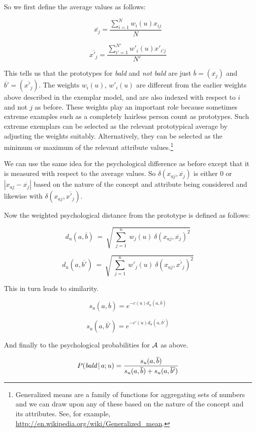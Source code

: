 So we first define the average values as follows:

\[ \overline{x_j} = \frac{\sum_{i = 1}^N w_i(u) x_{ij}}{N} \]

\[ \overline{x'_j} = \frac{\sum_{i' = 1}^{N'} w'_i(u) x'_{i'j}}{N'} \]

This tells us that the prototypes for \emph{bald} and \emph{not bald} are just $\overline{b} = (\overline{x_j})$ and $\overline{b'} = (\overline{x'_j})$. The weights $w_i(u)$, $w'_i(u)$ are different from the earlier weights above described in the exemplar model, and are also indexed with respect to $i$ and not $j$ as before. These weights play an important role because sometimes extreme examples such as a completely hairless person count as prototypes. Such extreme exemplars can be selected as the relevant prototypical average by adjusting the weights suitably. Alternatively, they can be selected as the minimum or maximum of the relevant attribute values.\footnote{Generalized means are a family of functions for aggregating sets of numbers and we can draw upon any of these based on the nature of the concept and its attributes. See, for example, \url{http://en.wikipedia.org/wiki/Generalized_mean}.}


We can use the same idea for the psychological difference as before except that it is measured with respect to the average values. So $\delta(x_{aj}, \overline{x_{j}})$ is either $0$ or $|x_{aj} - \overline{x_{j}}|$ based on the nature of the concept and attribute being considered and likewise with $\delta(x_{aj}, \overline{x'_{j}})$.

Now the weighted psychological distance from the prototype is defined as follows:

\[ d_u(a, \overline{b})\ = \ \sqrt{\ \sum_{j = 1}^{n}\ w_j(u)\ \delta(x_{aj}, \overline{x_j})^2} \]

\[ d_u(a, \overline{b'})\ = \ \sqrt{\ \sum_{j = 1}^{n}\ w'_j(u)\ \delta(x_{aj}, \overline{x'_{j}})^2} \]

This in turn leads to similarity.

\[ s_u(a, \overline{b}) = e^{-c(u)d_u(a, \overline{b})} \] 

\[ s_u(a, \overline{b'}) = e^{-c'(u)d_u(a, \overline{b'})} \]

And finally to the psychological probabilities for $\cal A$ as above.

\[ P(\emph{bald} \,|\, a; u) = \frac{s_u(a, \overline{b})}{s_u(a, \overline{b}) + s_u(a, \overline{b'})} \]

